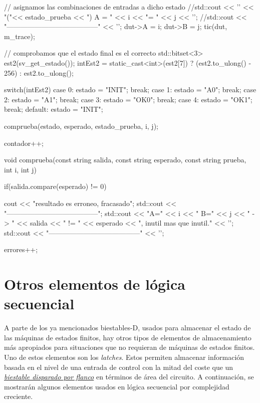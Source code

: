 \begin{mycode}[style=verilogstyle, caption={Banco de pruebas en C++ que se simula con Verilator.}, label=lst:mef-verilator]
{{{                
                // asignamos las combinaciones de entradas a dicho estado
                //std::cout << '\n' << "("<< estado_prueba << ") A = " << i << "\tB = " << j << '\n';
                //std::cout << "---------------------------------------" << '\n';
                dut->A = i;
                dut->B = j;
                tic(dut, m_trace);
    
               // comprobamos que el estado final es el correcto 
                std::bitset<3> est2(sv_get_estado());
                intEst2 = static_cast<int>(est2[7]) ? (est2.to_ulong() - 256) : est2.to_ulong();
    
                switch(intEst2){
                    case 0: estado = "INIT"; break;
                    case 1: estado = "A0"; break;
                    case 2: estado = "A1"; break;
                    case 3: estado = "OK0"; break;
                    case 4: estado = "OK1"; break;
                    default: estado = "INIT";
                }
    
                comprueba(estado, esperado, estado_prueba, i, j);
    
                contador++;
            }
        }
    }
    
    void comprueba(const string salida, const string esperado, const string prueba, int i, int j){
        if(salida.compare(esperado) != 0){
            cout << "\nEl resultado es erroneo, fracasado";
            std::cout << "\n---------------------------------------\n";
            std::cout << "A=" << i << " B=" << j << " -> " << salida << " != " << esperado << ", inutil mas que inutil." << '\n';
            std::cout << "---------------------------------------" << '\n';
    
            errores++;
        }
    }
\end{mycode}

\section{Otros elementos de lógica secuencial}
A parte de los ya mencionados biestables-D, usados para almacenar el estado de las máquinas de estados finitos, hay otros tipos de elementos de almacenamiento más apropiados para situaciones que no requieran de máquinas de estados finitos. Uno de estos elementos son los \emph{latches}. Estos permiten almacenar información basada en el nivel de una entrada de control con la mitad del coste que un \hyperlink{edge-triggered_flip-flop}{\emph{biestable disparado por flanco}} en términos de área del circuito. A continuación, se mostrarán algunos elementos usados en lógica secuencial por complejidad creciente.


